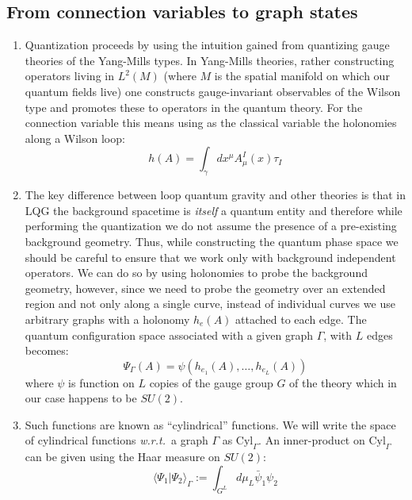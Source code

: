 \documentclass[preprint]{SciPost}
\newcommand{\wrt}{\textit{w.r.t.}~}
\newcommand{\innerp}[2]{\langle #1 \vert #2 \rangle}
\newcommand{\Cyl}{\mathrm{Cyl}}
\theoremstyle{plain} %
\begin{document}
\subsection*{From connection variables to graph states}
	\begin{enumerate}[label=\arabic*.]
		\item Quantization proceeds by using the intuition gained from quantizing gauge theories of the Yang-Mills types. In Yang-Mills theories, rather constructing operators living in $ L^2(M) $ (where $ M $ is the spatial manifold on which our quantum fields live) one constructs gauge-invariant observables of the Wilson type and promotes these to operators in the quantum theory. For the connection variable this means using as the classical variable the holonomies along a Wilson loop:
		\begin{equation}\label{eqn:wilson-loop}
		h(A) = \int_\gamma dx^\mu A_\mu^I(x) \tau_I		\end{equation}
		\item The key difference between loop quantum gravity and other theories is that in LQG the background spacetime is \emph{itself} a quantum entity and therefore while performing the quantization we do not assume the presence of a pre-existing background geometry. Thus, while constructing the quantum phase space we should be careful to ensure that we work only with background independent operators. We can do so by \cite[Sec 3.2]{Ashtekar2004Background} using holonomies to probe the background geometry, however, since we need to probe the geometry over an extended region and not only along a single curve, instead of individual curves we use arbitrary graphs with a holonomy $ h_e(A) $ attached to each edge. The quantum configuration space associated with a given graph $ \Gamma $, with $ L $ edges becomes:
		\begin{equation}\label{eqn:lqg-config-space}
		\Psi_\Gamma(A) = \psi(h_{e_1}(A), \ldots, h_{e_L}(A))
		\end{equation}
		where $ \psi $ is function on $ L $ copies of the gauge group $ G $ of the theory which in our case happens to be $ SU(2) $.
		\item Such functions are known as ``cylindrical'' functions. We will write the space of cylindrical functions \wrt a graph $ \Gamma $ as $ \Cyl_\Gamma $. An inner-product on $ \Cyl_\Gamma $ can be given using the Haar measure on $ SU(2) $:
		\begin{equation}\label{eqn:lqg-inner-product}
		\innerp{\Psi_1}{\Psi_2}_\Gamma := \int_{G^L} d\mu_L \bar\psi_1 \psi_2

\end{equation}
\end{enumerate}
\end{document}
